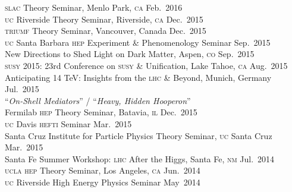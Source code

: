 \documentclass[margin,line]{resume}
\newcommand{\mytalksep}{-.1mm}
\newcommand{\mytalkskip}{2mm}
\newcommand{\scap}[1]{\textsc{\MakeLowercase{#1}}}
\begin{document}
\begin{resume}
\scap{SLAC} 
Theory Seminar, Menlo Park, \scap{CA}
\hfill %
Feb.~2016\vspace{\mytalksep}\\   
%
\scap{UC} Riverside
Theory Seminar, Riverside, \scap{CA}
\hfill %
Dec.~2015\vspace{\mytalksep}\\   
%
\scap{TRIUMF}
Theory Seminar, Vancouver, Canada
\hfill %
Dec.~2015\vspace{\mytalksep}\\   
%
\scap{UC} Santa Barbara \scap{HEP} Experiment \& Phenomenology Seminar
\hfill %
Sep.~2015\vspace{\mytalksep}\\  
%
New Directions to Shed Light on Dark Matter, Aspen, \scap{CO} 
\hfill %
Sep.~2015\vspace{\mytalksep}\\   
%
\scap{SUSY} 2015: 23rd Conference on \scap{SUSY} \& Unification, Lake Tahoe, \scap{CA}
\hfill %
Aug.~2015\vspace{\mytalksep}\\   
%
Anticipating 14 TeV: Insights %
from the \textsc{lhc} \& Beyond, Munich, Germany
\hfill %
Jul.~2015\vspace{\mytalkskip}\\
%
%
%
``\emph{On-Shell Mediators}'' / 
``\emph{Heavy, Hidden Hooperon}''
\vspace{\mytalksep}\\ 
Fermilab \scap{HEP} Theory Seminar, Batavia, \scap{IL}
\hfill %
Dec.~2015\vspace{\mytalksep}\\   
%
\scap{UC} Davis \scap{HEFTI} Seminar
\hfill %
Mar.~2015\vspace{\mytalksep}\\   
%
Santa Cruz Institute for Particle Physics Theory Seminar, \scap{UC} Santa Cruz
\hfill %
Mar.~2015\vspace{\mytalksep}\\   
%
Santa Fe Summer Workshop: \scap{LHC} After the Higgs, Santa Fe, \scap{NM} 
\hfill %
Jul.~2014\vspace{\mytalksep}\\   
%
\scap{UCLA HEP} Theory Seminar, Los Angeles, \scap{CA}
\hfill %
Jun.~2014\vspace{\mytalksep}\\ 
%
\scap{UC} Riverside High Energy Physics Seminar
\hfill %
May~2014\vspace{\mytalksep}\\   

\end{resume}
\end{document}
